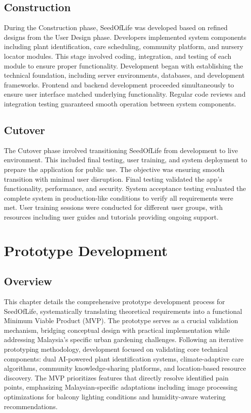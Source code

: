 \documentclass[conference]{IEEEtran}
\begin{document}
\subsection{Construction}
\label{subsec:construction}
During the Construction phase, SeedOfLife was developed based on refined designs from the User Design phase. Developers implemented system components including plant identification, care scheduling, community platform, and nursery locator modules. This stage involved coding, integration, and testing of each module to ensure proper functionality.
Development began with establishing the technical foundation, including server environments, databases, and development frameworks. Frontend and backend development proceeded simultaneously to ensure user interface matched underlying functionality. Regular code reviews and integration testing guaranteed smooth operation between system components.

\subsection{Cutover}
\label{subsec:cutover}
The Cutover phase involved transitioning SeedOfLife from development to live environment. This included final testing, user training, and system deployment to prepare the application for public use. The objective was ensuring smooth transition with minimal user disruption.
Final testing validated the app's functionality, performance, and security. System acceptance testing evaluated the complete system in production-like conditions to verify all requirements were met. User training sessions were conducted for different user groups, with resources including user guides and tutorials providing ongoing support.


\section{Prototype Development}

\subsection{Overview}
This chapter details the comprehensive prototype development process for SeedOfLife, systematically translating theoretical requirements into a functional Minimum Viable Product (MVP). The prototype serves as a crucial validation mechanism, bridging conceptual design with practical implementation while addressing Malaysia's specific urban gardening challenges. Following an iterative prototyping methodology, development focused on validating core technical components: dual AI-powered plant identification systems, climate-adaptive care algorithms, community knowledge-sharing platforms, and location-based resource discovery. The MVP prioritizes features that directly resolve identified pain points, emphasizing Malaysian-specific adaptations including image processing optimizations for balcony lighting conditions and humidity-aware watering recommendations.
\end{document}
